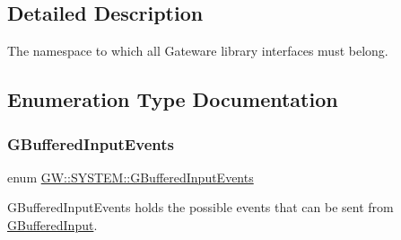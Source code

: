 \subsection{Detailed Description}
The namespace to which all Gateware library interfaces must belong. 

\subsection{Enumeration Type Documentation}
\mbox{\label{namespace_g_w_1_1_s_y_s_t_e_m_a309fd3a92512dd2bfa8065d99c0d7fcb}} 
\subsubsection{\texorpdfstring{G\+Buffered\+Input\+Events}{GBufferedInputEvents}}
{\footnotesize\ttfamily enum \mbox{\hyperlink{namespace_g_w_1_1_s_y_s_t_e_m_a309fd3a92512dd2bfa8065d99c0d7fcb}{G\+W\+::\+S\+Y\+S\+T\+E\+M\+::\+G\+Buffered\+Input\+Events}}}



G\+Buffered\+Input\+Events holds the possible events that can be sent from \mbox{\hyperlink{class_g_w_1_1_s_y_s_t_e_m_1_1_g_buffered_input}{G\+Buffered\+Input}}. 

